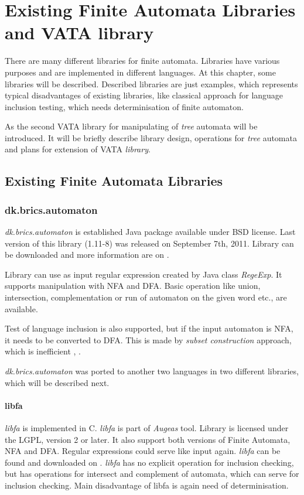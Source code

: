 \chapter{Existing Finite Automata Libraries and VATA library} %
\label{libraries}
There are many different libraries for finite automata. Libraries have various purposes and 
are implemented in different languages. 
At this chapter, some libraries will be described. Described libraries are just examples, which represents typical disadvantages of existing libraries, like
classical approach for language inclusion testing, which needs determinisation of finite automaton. 

As the second VATA library for manipulating of \emph{tree} automata will be introduced. It will be briefly describe library design, operations for \emph{tree}
automata and plans for extension of VATA \emph{library}.

\section{Existing Finite Automata Libraries}
\label{existinglibraries}
\subsection{dk.brics.automaton}
\label{brics}
\emph{dk.brics.automaton} is established Java package available under BSD license. Last version of this library (1.11-8) was released on September 7th, 2011.
Library can be downloaded and more information are on \cite{brics}. 

Library can use as input regular expression created by Java class \emph{RegeExp}.
It supports manipulation with NFA and DFA. Basic operation like union,
intersection, complementation or run of automaton on the given word etc., are available.

Test of language inclusion is also supported, but if the input automaton is NFA, it needs to be converted to DFA. 
This is made by \emph{subset construction} approach, which is inefficient \cite{cav06}, \cite{tacas10}.

\emph{dk.brics.automaton} was ported to another two languages in two different libraries, which will be described next.

\subsubsection{libfa}
\emph{libfa} is implemented in C. \emph{libfa} is part
of \emph{Augeas} tool. Library is licensed under the LGPL, version 2 or later. It also support both versions of Finite Automata, NFA and DFA. 
Regular expressions could serve like input again.
\emph{libfa} can be found and downloaded on \cite{libfa}.
\emph{libfa} has no explicit operation for inclusion checking, but has operations for intersect and complement of automata, which can serve for inclusion checking.
Main disadvantage of libfa is again need of determinisation.

